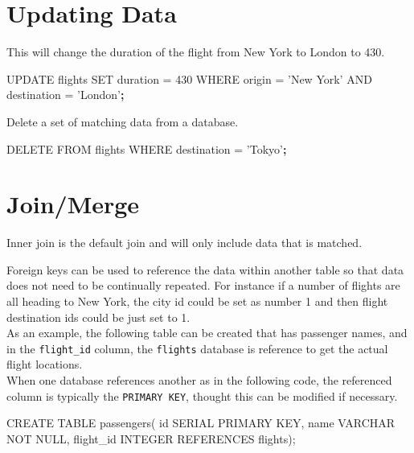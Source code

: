 \documentclass[]{book}
\newenvironment{Shaded}{\begin{snugshade}}{\end{snugshade}}
\newcommand{\KeywordTok}[1]{\textcolor[rgb]{0.13,0.29,0.53}{\textbf{#1}}}
\newcommand{\StringTok}[1]{\textcolor[rgb]{0.31,0.60,0.02}{#1}}
\newcommand{\FunctionTok}[1]{\textcolor[rgb]{0.00,0.00,0.00}{#1}}
\newcommand{\ExtensionTok}[1]{#1}
\newcommand{\NormalTok}[1]{#1}
\begin{document}
\section{Updating Data}\label{updating-data}

This will change the duration of the flight from New York to London to
430.

\begin{Shaded}
\begin{Highlighting}[]
\ExtensionTok{UPDATE}\NormalTok{ flights}
\ExtensionTok{SET}\NormalTok{ duration = 430}
\ExtensionTok{WHERE}\NormalTok{ origin = }\StringTok{'New York'}
\ExtensionTok{AND}\NormalTok{ destination = }\StringTok{'London'}\KeywordTok{;}
\end{Highlighting}
\end{Shaded}

Delete a set of matching data from a database.

\begin{Shaded}
\begin{Highlighting}[]
\ExtensionTok{DELETE}\NormalTok{ FROM flights}
\ExtensionTok{WHERE}\NormalTok{ destination = }\StringTok{'Tokyo'}\KeywordTok{;}
\end{Highlighting}
\end{Shaded}

\section{Join/Merge}\label{joinmerge}

Inner join is the default join and will only include data that is
matched.

Foreign keys can be used to reference the data within another table so
that data does not need to be continually repeated. For instance if a
number of flights are all heading to New York, the city id could be set
as number 1 and then flight destination ids could be just set to 1.\\
As an example, the following table can be created that has passenger
names, and in the \texttt{flight\_id} column, the \texttt{flights}
database is reference to get the actual flight locations.\\
When one database references another as in the following code, the
referenced column is typically the \texttt{PRIMARY\ KEY}, thought this
can be modified if necessary.

\begin{Shaded}
\begin{Highlighting}[]
\ExtensionTok{CREATE}\NormalTok{ TABLE passengers(}
    \FunctionTok{id}\NormalTok{ SERIAL PRIMARY KEY,}
    \ExtensionTok{name}\NormalTok{ VARCHAR NOT NULL,}
    \ExtensionTok{flight_id}\NormalTok{ INTEGER REFERENCES flights);}
\end{Highlighting}
\end{Shaded}
\end{document}
